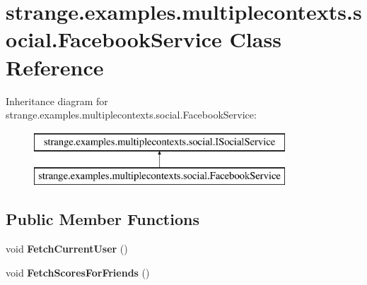 \hypertarget{classstrange_1_1examples_1_1multiplecontexts_1_1social_1_1_facebook_service}{\section{strange.\-examples.\-multiplecontexts.\-social.\-Facebook\-Service Class Reference}
\label{classstrange_1_1examples_1_1multiplecontexts_1_1social_1_1_facebook_service}
}
Inheritance diagram for strange.\-examples.\-multiplecontexts.\-social.\-Facebook\-Service\-:\begin{figure}[H]
\begin{center}
\leavevmode
\includegraphics[height=2.000000cm]{classstrange_1_1examples_1_1multiplecontexts_1_1social_1_1_facebook_service}
\end{center}
\end{figure}
\subsection*{Public Member Functions}
\begin{DoxyCompactItemize}
\item 
\hypertarget{classstrange_1_1examples_1_1multiplecontexts_1_1social_1_1_facebook_service_a10d31e227d25e20a13388d485aeba2a5}{void {\bfseries Fetch\-Current\-User} ()}\label{classstrange_1_1examples_1_1multiplecontexts_1_1social_1_1_facebook_service_a10d31e227d25e20a13388d485aeba2a5}

\item 
\hypertarget{classstrange_1_1examples_1_1multiplecontexts_1_1social_1_1_facebook_service_a32a1cbbece316e8f6765caee4a76ceef}{void {\bfseries Fetch\-Scores\-For\-Friends} ()}\label{classstrange_1_1examples_1_1multiplecontexts_1_1social_1_1_facebook_service_a32a1cbbece316e8f6765caee4a76ceef}

\end{DoxyCompactItemize}
